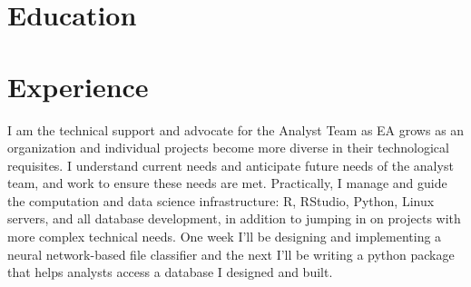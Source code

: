 \documentclass[10pt,letterpaper,colorlinks]{moderncv}
\begin{document}
\hypersetup{urlcolor=blue}
\makecvtitle

\section{Education}

\section{Experience}
{I am the technical support and advocate for the Analyst Team as EA grows as an organization and individual projects become more diverse in their technological requisites. I understand current needs and anticipate future needs of the analyst team, and work to ensure these needs are met. Practically, I manage and guide the computation and data science infrastructure: R, RStudio, Python, Linux servers, and all database development, in addition to jumping in on projects with more complex technical needs. One week I'll be designing and implementing a neural network-based file classifier and the next I'll be writing a python package that helps analysts access a database I designed and built.}
\end{document}
